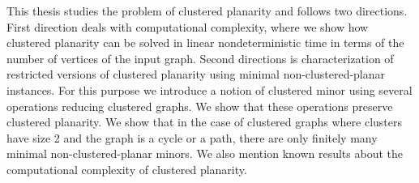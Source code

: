 This thesis studies the problem of clustered planarity and follows two directions. First direction deals with computational complexity, where we show how clustered planarity can be solved in linear nondeterministic time in terms of the number of vertices of the input graph. Second directions is characterization of restricted versions of clustered planarity using minimal non-clustered-planar instances.  For this purpose we introduce a notion of clustered minor using several operations reducing clustered graphs. We show that these operations  preserve clustered planarity. We show that in the case of clustered graphs where clusters have size 2 and the graph is a cycle or a path, there are only finitely many minimal non-clustered-planar minors. We also mention known results about the computational complexity of clustered planarity.